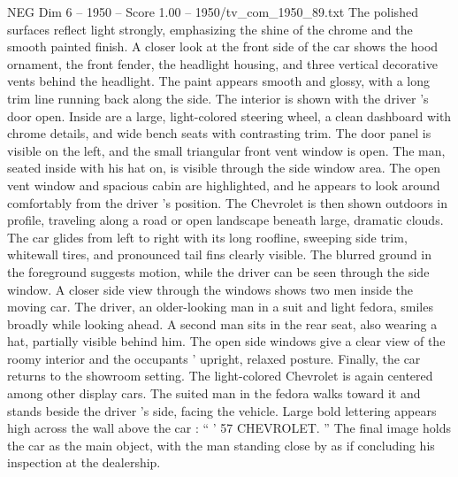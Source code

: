 \begin{textsample}{NEG Dim 6 – 1950 – Score 1.00 – 1950/tv\_com\_1950\_89.txt}
The polished surfaces reflect light strongly, emphasizing the shine of the chrome and the smooth painted finish.
A closer look at the front side of the car shows the hood ornament, the front fender, the headlight housing, and three vertical decorative vents behind the headlight.
The paint appears smooth and glossy, with a long trim line running back along the side.
The interior is shown with the driver ’s door open.
Inside are a large, light-colored steering wheel, a clean dashboard with chrome details, and wide bench seats with contrasting trim.
The door panel is visible on the left, and the small triangular front vent window is open.
The man, seated inside with his hat on, is visible through the side window area.
The open vent window and spacious cabin are highlighted, and he appears to look around comfortably from the driver ’s position.
The Chevrolet is then shown outdoors in profile, traveling along a road or open landscape beneath large, dramatic clouds.
The car glides from left to right with its long roofline, sweeping side trim, whitewall tires, and pronounced tail fins clearly visible.
The blurred ground in the foreground suggests motion, while the driver can be seen through the side window.
A closer side view through the windows shows two men inside the moving car.
The driver, an older-looking man in a suit and light fedora, smiles broadly while looking ahead.
A second man sits in the rear seat, also wearing a hat, partially visible behind him.
The open side windows give a clear view of the roomy interior and the occupants ’ upright, relaxed posture.
Finally, the car returns to the showroom setting.
The light-colored Chevrolet is again centered among other display cars.
The suited man in the fedora walks toward it and stands beside the driver ’s side, facing the vehicle.
Large bold lettering appears high across the wall above the car : “ ’ 57 CHEVROLET. ” The final image holds the car as the main object, with the man standing close by as if concluding his inspection at the dealership.

\end{textsample}
